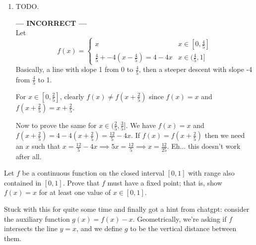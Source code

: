 \documentclass{oxmathproblems}
\begin{document}
\begin{questions}
\begin{solution}
\begin{enumerate}[label=(\alph*)]
    Assume $n=3$ and consider $g(0), g(\frac{1}{3}), $ and $g(\frac{2}{3})$. If any of them are zero then we're done. Otherwise, like part (a) we'll prove that there exist
    $i < j$ such that $g(i)$ and $g(j)$ have different signs. Then we'll apply IVT to conclude the existence of $g(x)=0$ for some $x$.

    Is it possible for all three $g$'s to be positive? Suppose $g(0)$ and $g(\frac{1}{3})$ are positive, then we can conclude that $f(0) > f(\frac{1}{3}) > f(\frac{2}{3})$.
    But $f(0)=f(1)$, so we must have $f(1) > f(\frac{2}{3}) \implies g(\frac{2}{3})$ is negative.

    A very similar argument can be used to prove that we can't have all three $g$'s negative, and it's also easy to generalize to arbitrary $n$.

    Equivalently, we can express the same argument with telescoping sum. Consider 
    \[\sum_{k=0}^{n-1}g\left(\frac{k}{n}\right) = \sum_{k=0}^{n-1}\left[ f\left(\frac{k}{n}\right) - f\left(\frac{k+1}{n}\right) \right]\]

    This sum telescopes to $f(0)-f(1)=0$. Since the sum is zero, we can't have all terms positive or all terms negative.
    
    \item TODO.
    
    \textbf{--- INCORRECT ---}\\
    Let
    \[
      f(x) = 
      \begin{cases}
        x & x \in [0, \frac{4}{5}]\\
        \frac{4}{5} + -4(x - \frac{4}{5}) = 4-4x & x \in (\frac{4}{5}, 1]
      \end{cases}
    \]
    Basically, a line with slope 1 from 0 to $\frac{4}{5}$, then a steeper descent with slope -4 from $\frac{4}{5}$ to 1.

    For $x \in [0, \frac{2}{5}]$, clearly $f(x) \neq f(x+\frac{2}{5})$ since $f(x)=x$ and $f(x+\frac{2}{5})=x+\frac{2}{5}$.

    Now to prove the same for $x \in (\frac{2}{5}, \frac{3}{5}]$. We have $f(x) = x$ and $f(x+\frac{2}{5}) = 4-4(x+\frac{2}{5}) = \frac{12}{5}-4x$. If $f(x)=f(x+\frac{2}{5})$ then
    we need an $x$ such that $x = \frac{12}{5}-4x \implies 5x = \frac{12}{5} \implies x = \frac{12}{25}$. Eh... this doesn't work after all.
  \end{enumerate} 
\end{solution}

\miquestion Let $f$ be a continuous function on the closed interval $[0, 1]$ with range also contained in $[0, 1]$. Prove that $f$ must have a fixed point; that is, show $f(x)=x$ for
at least one value of $x \in [0, 1]$.
\begin{solution}
  Stuck with this for quite some time and finally got a hint from chatgpt: consider the auxiliary function $g(x)=f(x)-x$. Geometrically, we're asking if $f$ intersects the line $y=x$, and we define
  $g$ to be the vertical distance between them.


\end{solution}
\end{questions}
\end{document}
